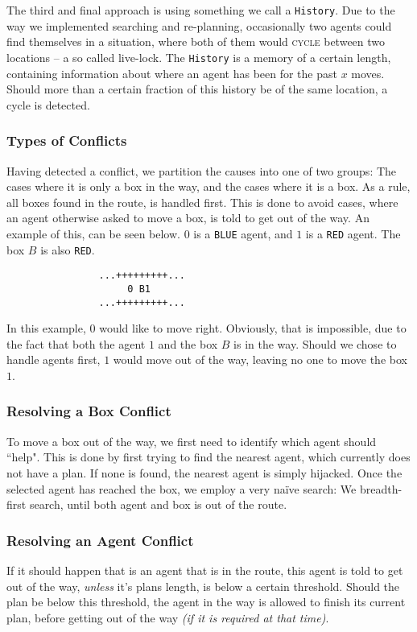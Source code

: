 \documentclass[letterpaper]{article}
\begin{document}
			The third and final approach is using something we call a \verb=History=. Due to the way we implemented searching and re-planning, occasionally two agents could find themselves in a situation, where both of them would \textsc{cycle} between two locations -- a so called live-lock. The \verb=History= is a memory of a certain length, containing information about where an agent has been for the past $x$ moves. Should more than a certain fraction of this history be of the same location, a cycle is detected.

		\subsubsection{Types of Conflicts}
			Having detected a conflict, we partition the causes into one of two groups: The cases where it is only a box in the way, and the cases where it is a box. As a rule, all boxes found in the route, is handled first. This is done to avoid cases, where an agent otherwise asked to move a box, is told to get out of the way. An example of this, can be seen below. $0$ is a \verb=BLUE= agent, and $1$ is a \verb=RED= agent. The box $B$ is also \verb=RED=. 
			\begin{verbatim}
				...+++++++++...
				     0 B1
				...+++++++++...
			\end{verbatim}
			In this example, $0$ would like to move right. Obviously, that is impossible, due to the fact that both the agent $1$ and the box $B$ is in the way. Should we chose to handle agents first, $1$ would move out of the way, leaving no one to move the box $1$.

		\subsubsection{Resolving a Box Conflict}
			To move a box out of the way, we first need to identify which agent should ``help". This is done by first trying to find the nearest agent, which currently does not have a plan. If none is found, the nearest agent is simply hijacked. Once the selected agent has reached the box, we employ a very naïve search: We breadth-first search, until both agent and box is out of the route.

		\subsubsection{Resolving an Agent Conflict}
			If it should happen that is an agent that is in the route, this agent is told to get out of the way, \emph{unless} it's plans length, is below a certain threshold. Should the plan be below this threshold, the agent in the way is allowed to finish its current plan, before getting out of the way \emph{(if it is required at that time)}.
\end{document}
